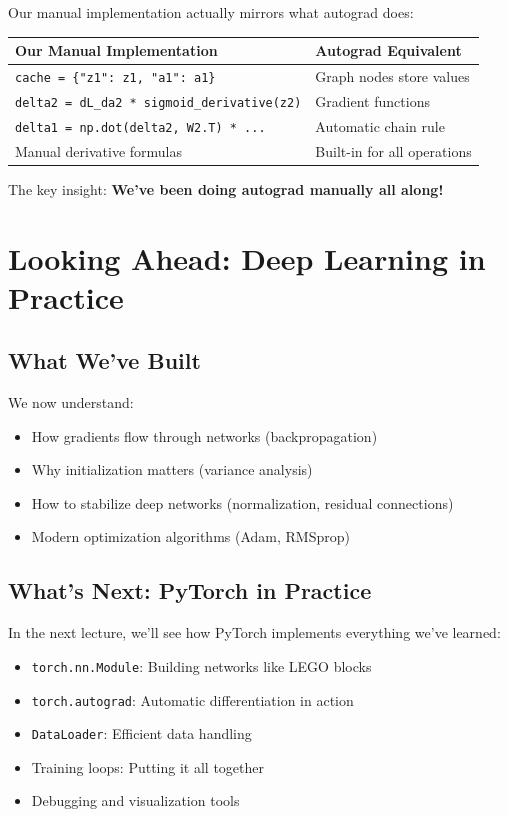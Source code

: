 \documentclass{article}
\begin{document}
Our manual implementation actually mirrors what autograd does:

\begin{center}
\begin{tabular}{|l|l|}
\hline
\textbf{Our Manual Implementation} & \textbf{Autograd Equivalent} \\
\hline
\texttt{cache = \{"z1": z1, "a1": a1\}} & Graph nodes store values \\
\texttt{delta2 = dL\_da2 * sigmoid\_derivative(z2)} & Gradient functions \\
\texttt{delta1 = np.dot(delta2, W2.T) * ...} & Automatic chain rule \\
Manual derivative formulas & Built-in for all operations \\
\hline
\end{tabular}
\end{center}

The key insight: \textbf{We've been doing autograd manually all along!}
\section{Looking Ahead: Deep Learning in Practice}

\subsection{What We've Built}
We now understand:
\begin{itemize}
    \item How gradients flow through networks (backpropagation)
    \item Why initialization matters (variance analysis)
    \item How to stabilize deep networks (normalization, residual connections)
    \item Modern optimization algorithms (Adam, RMSprop)
\end{itemize}

\subsection{What's Next: PyTorch in Practice}
In the next lecture, we'll see how PyTorch implements everything we've learned:
\begin{itemize}
    \item \texttt{torch.nn.Module}: Building networks like LEGO blocks
    \item \texttt{torch.autograd}: Automatic differentiation in action
    \item \texttt{DataLoader}: Efficient data handling
    \item Training loops: Putting it all together
    \item Debugging and visualization tools
\end{itemize}
\end{document}

